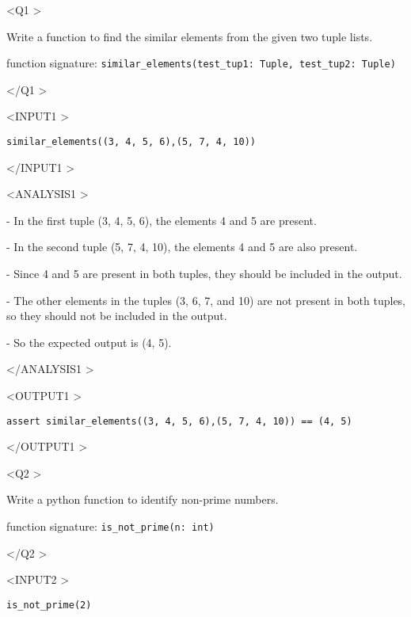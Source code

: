 \begin{tcolorbox}[
    colback=gray!10,           %
    colframe=gray!75,          %
    title=Prompt for Generating Test Output,      %
    fonttitle=\bfseries,       %
    width=\textwidth,          %
    sharp corners,             %
    boxrule=0.75mm,            %
    coltitle=black             %
]
\textless Q1 \textgreater

Write a function to find the similar elements from the given two tuple lists.

function signature: {\tt similar\_elements(test\_tup1: Tuple, test\_tup2: Tuple)}

\textless/Q1 \textgreater

\textless INPUT1 \textgreater

{\tt similar\_elements((3, 4, 5, 6),(5, 7, 4, 10))}

\textless /INPUT1 \textgreater

\textless ANALYSIS1 \textgreater

- In the first tuple (3, 4, 5, 6), the elements 4 and 5 are present.

- In the second tuple (5, 7, 4, 10), the elements 4 and 5 are also present.

- Since 4 and 5 are present in both tuples, they should be included in the output.

- The other elements in the tuples (3, 6, 7, and 10) are not present in both tuples, so they should not be included in the output.

- So the expected output is (4, 5).

\textless /ANALYSIS1 \textgreater

\textless OUTPUT1 \textgreater

{\tt assert similar\_elements((3, 4, 5, 6),(5, 7, 4, 10)) == (4, 5)}

\textless /OUTPUT1 \textgreater

\textless Q2 \textgreater

Write a python function to identify non-prime numbers.

function signature: {\tt is\_not\_prime(n: int)}

\textless /Q2 \textgreater

\textless INPUT2 \textgreater

{\tt is\_not\_prime(2)}


\end{tcolorbox}
